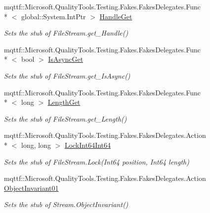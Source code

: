 \begin{DoxyCompactItemize}
mqttf\-::\-Microsoft.\-Quality\-Tools.\-Testing.\-Fakes.\-Fakes\-Delegates.\-Func\\*
$<$ global\-::\-System.\-Int\-Ptr $>$ \hyperlink{class_system_1_1_i_o_1_1_fakes_1_1_stub_file_stream_af097fdb5e36bd9bb20ac86b41f4453de}{Handle\-Get}
\begin{DoxyCompactList}\small\item\em Sets the stub of File\-Stream.\-get\-\_\-\-Handle()\end{DoxyCompactList}\item 
mqttf\-::\-Microsoft.\-Quality\-Tools.\-Testing.\-Fakes.\-Fakes\-Delegates.\-Func\\*
$<$ bool $>$ \hyperlink{class_system_1_1_i_o_1_1_fakes_1_1_stub_file_stream_a25ba1d774c342bd20d9f0b2f0a717193}{Is\-Async\-Get}
\begin{DoxyCompactList}\small\item\em Sets the stub of File\-Stream.\-get\-\_\-\-Is\-Async()\end{DoxyCompactList}\item 
mqttf\-::\-Microsoft.\-Quality\-Tools.\-Testing.\-Fakes.\-Fakes\-Delegates.\-Func\\*
$<$ long $>$ \hyperlink{class_system_1_1_i_o_1_1_fakes_1_1_stub_file_stream_a410868c5e5f2f60a3dfcb4106ecb3bab}{Length\-Get}
\begin{DoxyCompactList}\small\item\em Sets the stub of File\-Stream.\-get\-\_\-\-Length()\end{DoxyCompactList}\item 
mqttf\-::\-Microsoft.\-Quality\-Tools.\-Testing.\-Fakes.\-Fakes\-Delegates.\-Action\\*
$<$ long, long $>$ \hyperlink{class_system_1_1_i_o_1_1_fakes_1_1_stub_file_stream_a5349cd1264a9a0a2586131d1ca4a1669}{Lock\-Int64\-Int64}
\begin{DoxyCompactList}\small\item\em Sets the stub of File\-Stream.\-Lock(\-Int64 position, Int64 length)\end{DoxyCompactList}\item 
mqttf\-::\-Microsoft.\-Quality\-Tools.\-Testing.\-Fakes.\-Fakes\-Delegates.\-Action \hyperlink{class_system_1_1_i_o_1_1_fakes_1_1_stub_file_stream_a0f847be5ace85ee55d2a540469d18541}{Object\-Invariant01}
\begin{DoxyCompactList}\small\item\em Sets the stub of Stream.\-Object\-Invariant()\end{DoxyCompactList}\item 

\end{DoxyCompactItemize}
